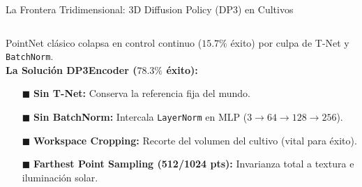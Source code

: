 \begin{frame}{La Frontera Tridimensional: 3D Diffusion Policy (DP3) en Cultivos}
  \vspace{0.8mm}
  \begin{columns}[T, onlytextwidth]
    \begin{column}{0.51\textwidth}
      \begin{tcolorbox}[
        enhanced,
        colback=WhiteBg,
        colframe=UCNCyan,
        arc=\CardArc,
        boxrule=\CardRule,
        height=\CardHeightDouble,
        title={\CardTitleFont El Descubrimiento Forense de DP3 \cite{ze2024dp3}},
        colbacktitle=UCNCyan,
        coltitle=WhiteBg,
        top=1.0mm, bottom=1.0mm, left=1.6mm, right=1.6mm
      ]
        {\BodyFont
        PointNet clásico colapsa en control continuo ($15.7\%$ éxito) por culpa de T-Net y \texttt{BatchNorm}.\\
        \textbf{La Solución DP3Encoder ($78.3\%$ éxito):}
        \vspace{0.4mm}
        \begin{itemize}\setlength{\itemsep}{0.6pt}
          \item[\textcolor{UCNCyan}{$\blacksquare$}] \textbf{Sin T-Net:} Conserva la referencia fija del mundo.
          \item[\textcolor{UCNCyan}{$\blacksquare$}] \textbf{Sin BatchNorm:} Intercala \texttt{LayerNorm} en MLP ($3 \to 64 \to 128 \to 256$).
          \item[\textcolor{UCNCyan}{$\blacksquare$}] \textbf{Workspace Cropping:} Recorte del volumen del cultivo (vital para éxito).
          \item[\textcolor{UCNCyan}{$\blacksquare$}] \textbf{Farthest Point Sampling (512/1024 pts):} Invarianza total a textura e iluminación solar.
        \end{itemize}}
      \end{tcolorbox}
    \end{column}


\end{columns}
\end{frame}
